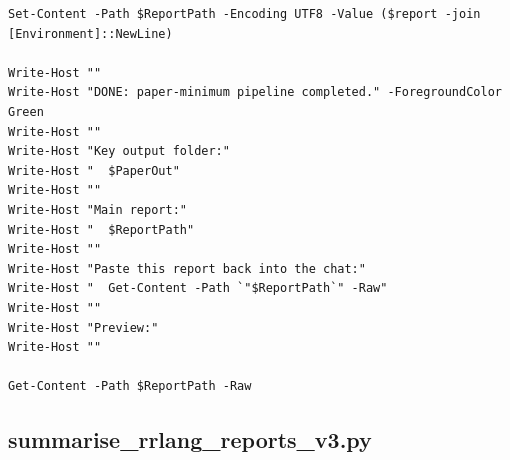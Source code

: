 \documentclass[11pt,a4paper]{article}
\begin{document}
\begin{lstlisting}
Set-Content -Path $ReportPath -Encoding UTF8 -Value ($report -join [Environment]::NewLine)

Write-Host ""
Write-Host "DONE: paper-minimum pipeline completed." -ForegroundColor Green
Write-Host ""
Write-Host "Key output folder:"
Write-Host "  $PaperOut"
Write-Host ""
Write-Host "Main report:"
Write-Host "  $ReportPath"
Write-Host ""
Write-Host "Paste this report back into the chat:"
Write-Host "  Get-Content -Path `"$ReportPath`" -Raw"
Write-Host ""
Write-Host "Preview:"
Write-Host ""

Get-Content -Path $ReportPath -Raw
\end{lstlisting}

\subsection{summarise\_rrlang\_reports\_v3.py}
\end{document}
